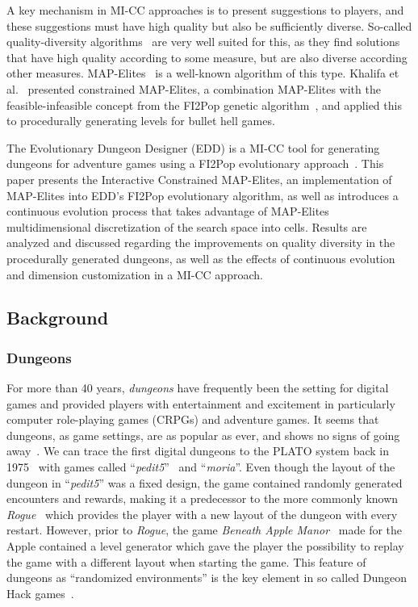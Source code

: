 A key mechanism in MI-CC approaches is to present suggestions to players, and these suggestions must have high quality but also be sufficiently diverse. So-called quality-diversity algorithms~ are very well suited for this, as they find solutions that have high quality according to some measure, but are also diverse according other measures. MAP-Elites~ is a well-known algorithm of this type. Khalifa et al.~ presented constrained MAP-Elites, a combination MAP-Elites with the feasible-infeasible concept from the FI2Pop genetic algorithm~, and applied this to procedurally generating levels for bullet hell games.

The Evolutionary Dungeon Designer (EDD) is a MI-CC tool for generating dungeons for adventure games using a FI2Pop evolutionary approach~. This paper presents the Interactive Constrained MAP-Elites, an implementation of MAP-Elites into EDD's FI2Pop evolutionary algorithm, as well as introduces a continuous evolution process that takes advantage of MAP-Elites multidimensional discretization of the search space into cells. Results are analyzed and discussed regarding the improvements on quality diversity in the procedurally generated dungeons, as well as the effects of continuous evolution and dimension customization in a MI-CC approach.

\subsection{Background}
\subsubsection{Dungeons}
For more than 40 years, \emph{dungeons} have frequently been the setting for digital games and provided players with entertainment and excitement in particularly computer role-playing games (CRPGs) and adventure games. It seems that dungeons, as game settings, are as popular as ever, and shows no signs of going away~. We can trace the first digital dungeons to the PLATO system back in 1975~ with games called ``\emph{pedit5}''~ and ``\emph{moria}''. Even though the layout of the dungeon in ``\emph{pedit5}'' was a fixed design, the game contained randomly generated encounters and rewards, making it a predecessor to the more commonly known \emph{Rogue}~ which provides the player with a new layout of the dungeon with every restart. However, prior to \emph{Rogue}, the game \emph{Beneath Apple Manor}~ made for the Apple contained a level generator which gave the player the possibility to replay the game with a different layout when starting the game. This feature of dungeons as ``randomized environments'' is the key element in so called Dungeon Hack games~. 

